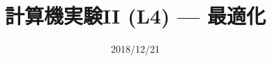 \documentclass[dvipdfmx]{beamer}
\title{計算機実験II (L4) --- 最適化}
\date{2018/12/21}
\begin{document}
\begin{frame}
  \titlepage
  \tableofcontents
\end{frame}












\end{document}

